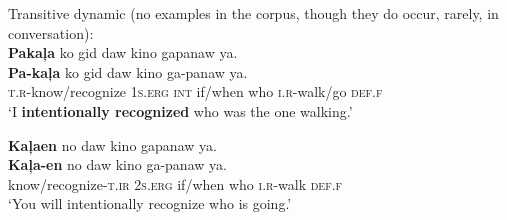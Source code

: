 \ea
Transitive dynamic (no examples in the corpus, though they do occur, rarely, in conversation): \\
\textbf{Pakaļa}  ko  gid  daw  kino  gapanaw  ya. \\\smallskip
\gll \textbf{Pa-kaļa}  ko  gid  daw  kino  ga-panaw  ya. \\
\textsc{t.r}-know/recognize  1\textsc{s.erg}  \textsc{int}  if/when  who  \textsc{i.r}-walk/go  \textsc{def.f} \\
\glt ‘I \textbf{intentionally recognized} who was the one walking.’
\z

\ea
\textbf{Kaļaen}  no  daw  kino  gapanaw  ya. \\\smallskip
\gll \textbf{Kaļa-en}  no  daw  kino  ga-panaw  ya. \\
know/recognize-\textsc{t.ir}  2\textsc{s.erg}  if/when  who  \textsc{i.r}-walk  \textsc{def.f} \\
\glt ‘You will intentionally recognize who is going.’
\z

